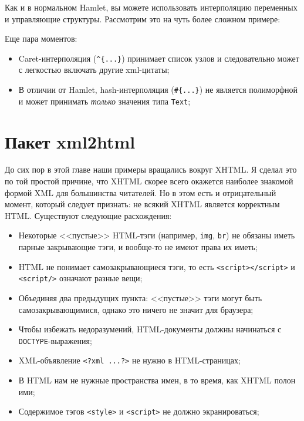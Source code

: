 Как и в нормальном Hamlet, вы можете использовать интерполяцию переменных и управляющие структуры. Рассмотрим это на чуть более сложном примере:



Еще пара моментов:

\begin{itemize}
\item Caret-интерполяция (\verb'^{...}') принимает список узлов и следовательно может с легкостью включать другие xml-цитаты;
\item В отличии от Hamlet, hash-интерполяция (\verb'#{...}') не является полиморфной и может принимать \emph{только} значения типа \lstinline!Text!;
\end{itemize}

\section{Пакет xml2html}

До сих пор в этой главе наши примеры вращались вокруг XHTML. Я сделал это по той простой причине, что XHTML скорее всего окажется наиболее знакомой формой XML для большинства читателей. Но в этом есть и отрицательный момент, который следует признать: не всякий XHTML является корректным HTML. Существуют следующие расхождения:

\begin{itemize}
\item Некоторые <<пустые>> HTML-тэги (например, \lstinline!img!, \lstinline!br!) не обязаны иметь парные закрывающие тэги, и вообще-то не имеют права их иметь;
\item HTML не понимает самозакрывающиеся тэги, то есть \lstinline!<script></script>! и \lstinline!<script/>! означают разные вещи;
\item Объединяя два предыдущих пункта: <<пустые>> тэги могут быть самозакрывающимися, однако это ничего не значит для браузера;
\item Чтобы избежать недоразумений, HTML-документы должны начинаться с \lstinline!DOCTYPE!-выражения;
\item XML-объявление \lstinline!<?xml ...?>! не нужно в HTML-страницах;
\item В HTML нам не нужные пространства имен, в то время, как XHTML полон ими;
\item Содержимое тэгов \lstinline!<style>! и \lstinline!<script>! не должно экранироваться; %
\end{itemize}
  
